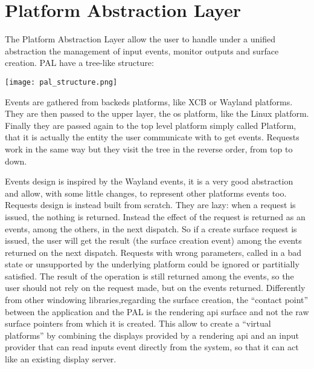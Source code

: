 \chapter{Platform Abstraction Layer}
The Platform Abstraction Layer allow the user to handle under a unified abstraction the management of input events, monitor outputs and surface creation. PAL have a tree-like structure: 
\begin{center}
	\texttt{[image: pal\_structure.png]}
\end{center}

Events are gathered from backeds platforms, like XCB or Wayland platforms. They are then passed to the upper layer, the os platform, like the Linux platform. Finally they are passed again to the top level platform simply called Platform, that it is actually the entity the user communicate with to get events. Requests work in the same way but they visit the tree in the reverse order, from top to down.

Events design is inspired by the Wayland events, it is a very good abstraction and allow, with some little changes, to represent other platforms events too. Requests design is instead built from scratch. They are lazy: when a request is issued, the nothing is returned. Instead the effect of the request is returned as an events, among the others, in the next dispatch. So if a create surface request is issued, the user will get the result (the surface creation event) among the events returned on the next dispatch.
Requests with wrong parameters, called in a bad state or unsupported by the underlying platform could be ignored or partitially satisfied. The result of the operation is still returned among the events, so the user should not rely on the request made, but on the events returned.
Differently from other windowing libraries,regarding the surface creation, the “contact point” between the application and the PAL is the rendering api surface and not the raw surface pointers from which it is created. This allow to create a “virtual platforms” by combining the displays provided by a rendering api and an input provider that can read inputs event directly from the system, so that it can act like an existing display server.
